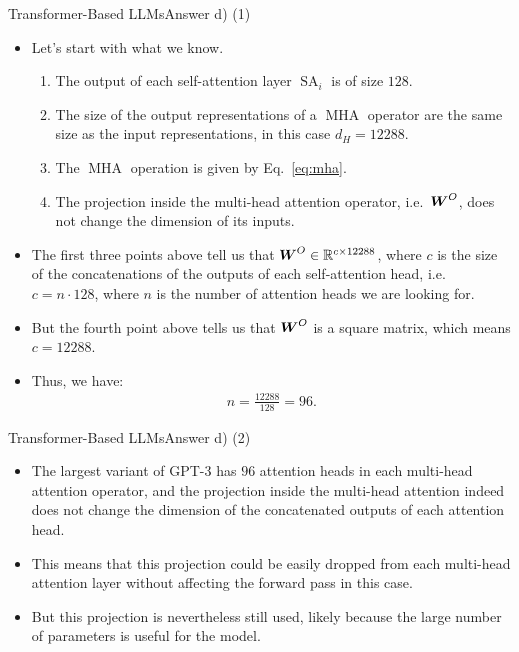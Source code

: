 \documentclass[t]{beamer}
\newcommand\op[1]{\operatorname{#1}}
\begin{document}
\begin{frame}{Transformer-Based LLMs}{Answer d) (1)}
    \begin{itemize}
        \item Let's start with what we know.
              \begin{enumerate}
                  \item The output of each self-attention layer $\op{SA}_i$ is
                        of size $128$.
                  \item The size of the output representations of a $\op{MHA}$
                        operator are the same size as the input representations,
                        in this case $d_H = 12288$.
                  \item The $\op{MHA}$ operation is given by Eq.~\ref{eq:mha}.
                  \item The projection inside the multi-head attention operator,
                        i.e.\ ${\boldsymbol{W}}^O$, does not change the dimension of its
                        inputs.
              \end{enumerate}
        \item The first three points above tell us that
              ${\boldsymbol{W}}^O\in\mathbb{R}^{c\times 12288}$, where $c$ is the size of the
              concatenations of the outputs of each self-attention head, i.e.
              $c = n\cdot 128$, where $n$ is the number of attention heads we
              are looking for.
        \item But the fourth point above tells us that ${\boldsymbol{W}}^O$ is a square
              matrix, which means $c = 12288$.
        \item Thus, we have:
              \begin{align}
                  n = \frac{12288}{128} = 96.
              \end{align}
    \end{itemize}
\end{frame}

\begin{frame}{Transformer-Based LLMs}{Answer d) (2)}
    \begin{itemize}
        \item The largest variant of GPT-3 has $96$ attention heads in each
              multi-head attention operator, and the projection inside the
              multi-head attention indeed does not change the dimension of the
              concatenated outputs of each attention head.
        \item This means that this projection could be easily dropped from each
              multi-head attention layer without affecting the forward pass in
              this case.
        \item But this projection is nevertheless still used, likely because the
              large number of parameters is useful for the model.
    \end{itemize}
\end{frame}
\end{document}
